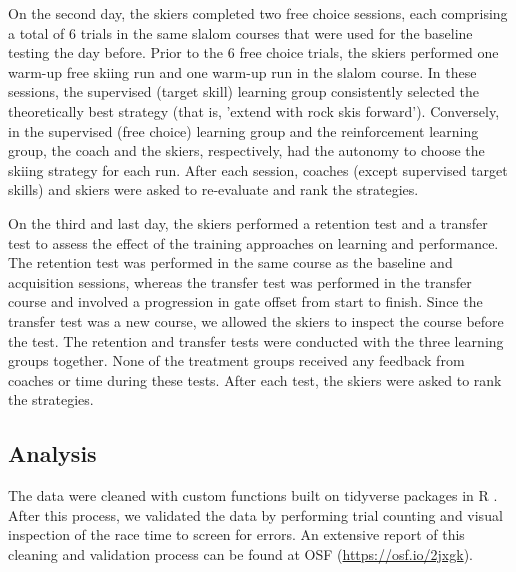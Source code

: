 \documentclass[pdflatex,sn-nature]{sn-jnl}%
\theoremstyle{thmstyleone}%
\theoremstyle{thmstyletwo}%
\theoremstyle{thmstylethree}%
\begin{document}
On the second day, the skiers completed two free choice sessions, each comprising a total of 6 trials in the same slalom courses that were used for the baseline testing the day before. Prior to the 6 free choice trials, the skiers performed one warm-up free skiing run and one warm-up run in the slalom course. In these sessions, the supervised (target skill) learning group consistently selected the theoretically best strategy (that is, 'extend with rock skis forward'). Conversely, in the supervised (free choice) learning group and the reinforcement learning group, the coach and the skiers, respectively, had the autonomy to choose the skiing strategy for each run. After each session, coaches (except supervised target skills) and skiers were asked to re-evaluate and rank the strategies.

On the third and last day, the skiers performed a retention test and a transfer test to assess the effect of the training approaches on learning and performance. The retention test was performed in the same course as the baseline and acquisition sessions, whereas the transfer test was performed in the transfer course and involved a progression in gate offset from start to finish. Since the transfer test was a new course, we allowed the skiers to inspect the course before the test. The retention and transfer tests were conducted with the three learning groups together. None of the treatment groups received any feedback from coaches or time during these tests. After each test, the skiers were asked to rank the strategies.


\subsection{Analysis}
The data were cleaned with custom functions built on tidyverse \cite{wickham_welcome_2019} packages in R \cite{r_core_team_r_2022}. After this process, we validated the data by performing trial counting and visual inspection of the race time to screen for errors. An extensive report of this cleaning and validation process can be found at OSF  (\url{https://osf.io/2jxgk}).
\end{document}
